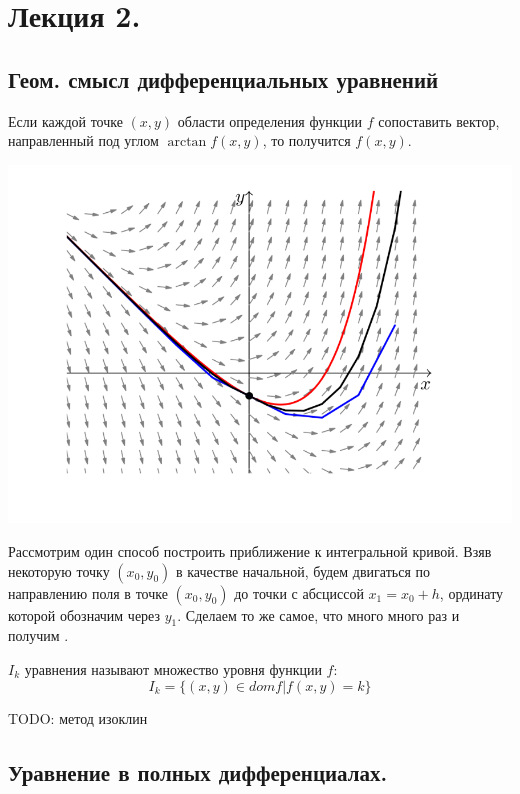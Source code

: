 \section{Лекция 2.}

\subsection{Геом. смысл дифференциальных уравнений}

 Если каждой точке $(x,y)$ области определения функции $f$ сопоставить вектор, направленный под углом $\arctan f(x,y)$, то получится  $f(x,y)$.

\begin{center}
   \includegraphics[width=14cm]{assets/2-arrows.png}
\end{center}


Рассмотрим один способ построить  приближение к интегральной кривой. Взяв некоторую точку $(x_0,y_0)$ в качестве начальной, будем двигаться по направлению поля в точке $(x_0,y_0)$ до точки с абсциссой $x_1 = x_0 +h$, ординату которой обозначим через $y_1$. Сделаем то же самое, что много много раз и получим . 

  $I_k$ уравнения называют множество уровня функции $f$:
$$I_k =\{(x,y)\in dom f | f(x,y) =k\}$$

TODO: метод изоклин 

\subsection{Уравнение в полных дифференциалах.}

